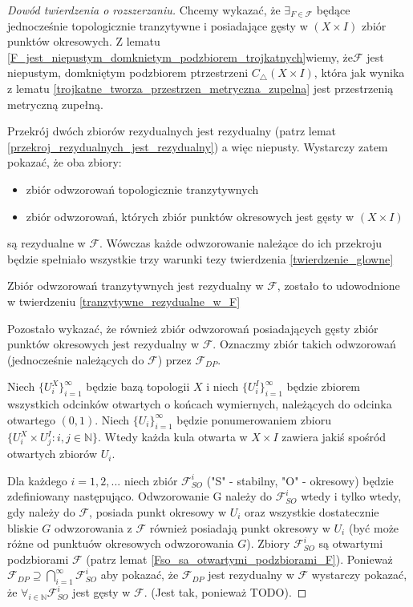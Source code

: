 \documentclass[licencjacka]{pwr_wmat_praca_dyplomowa}
\theoremstyle{plain}
\numberwithin{theorem}{chapter}
\theoremstyle{definition}
\numberwithin{theorem}{chapter}
\begin{document}
\begin{proof}[Dowód twierdzenia o rozszerzaniu]
Chcemy wykazać, że $\exists_{F \in \mathcal{F}}$ będące jednocześnie topologicznie tranzytywne i posiadające gęsty w $(X \times I)$ zbiór punktów okresowych. Z lematu \ref{F_jest_niepustym_domknietym_podzbiorem_trojkatnych}wiemy, że$\mathcal{F}$ jest niepustym, domkniętym podzbiorem ptrzestrzeni $C_{\triangle}(X \times I)$, która jak wynika z lematu \ref{trojkatne_tworza_przestrzen_metryczna_zupelna} jest przestrzenią metryczną zupełną. 

Przekrój dwóch zbiorów rezydualnych jest rezydualny (patrz lemat \ref{przekroj_rezydualnych_jest_rezydualny}) a więc niepusty. Wystarczy zatem pokazać, że oba zbiory:
\begin{itemize}
\item zbiór odwzorowań topologicznie tranzytywnych
\item zbiór odwzorowań, których zbiór punktów okresowych jest gęsty w $(X \times I)$
\end{itemize}
są rezydualne w $\mathcal{F}$. Wówczas każde odwzorowanie należące do ich przekroju będzie spełniało wszystkie trzy warunki tezy twierdzenia \ref{twierdzenie_glowne} 

Zbiór odwzorowań tranzytywnych jest rezydualny w $\mathcal{F}$, zostało to udowodnione w twierdzeniu \ref{tranzytywne_rezydualne_w_F}

Pozostało wykazać, że również zbiór odwzorowań posiadających gęsty zbiór punktów okresowych jest rezydualny w $\mathcal{F}$.
Oznaczmy zbiór takich odwzorowań (jednocześnie należących do $\mathcal{F}$) przez $\mathcal{F}_{DP}$.

Niech $\{U_i^X\}_{i=1}^{\infty}$ będzie bazą topologii $X$ i niech $\{U_i^I\}_{i=1}^{\infty}$ będzie zbiorem wszystkich odcinków otwartych o końcach wymiernych, należących do odcinka otwartego $(0, 1)$. Niech $\{U_i\}_{i=1}^{\infty}$ będzie ponumerowaniem zbioru $\{U_i^X \times U_j^I : i,j \in \mathbb{N}\}$. Wtedy każda kula otwarta w $X \times I$ zawiera jakiś spośród otwartych zbiorów $U_i$.

Dla każdego $i=1,2,...$ niech zbiór $\mathcal{F}_{SO}^i$ ("S" - stabilny, "O" - okresowy) będzie zdefiniowany następująco. Odwzorowanie G należy do $\mathcal{F}_{SO}^i$ wtedy i tylko wtedy, gdy należy do $\mathcal{F}$, posiada punkt okresowy w $U_i$ oraz wszystkie dostatecznie bliskie $G$ odwzorowania z $\mathcal{F}$ również posiadają punkt okresowy w $U_i$ (być może różne od punktuów okresowych odwzorowania $G$). Zbiory $\mathcal{F}_{SO}^i$ są otwartymi podzbiorami $\mathcal{F}$ (patrz lemat \ref{Fso_sa_otwartymi_podzbiorami_F}). Ponieważ $\mathcal{F}_{DP} \supseteq \bigcap_{i=1}^{\infty} \mathcal{F}_{SO}^i$ aby pokazać, że $\mathcal{F}_{DP}$ jest rezydualny w $\mathcal{F}$ wystarczy pokazać, że $\forall_{i \in \mathbb{N}} \mathcal{F}_{SO}^i$ jest gęsty w $\mathcal{F}$. (Jest tak, ponieważ TODO).


\end{proof}
\end{document}
